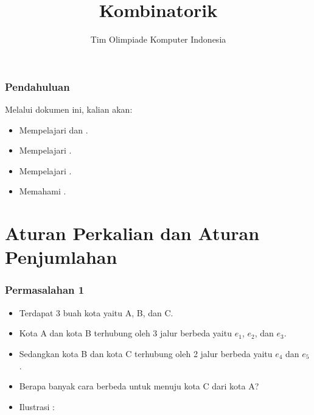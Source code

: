 
\usepackage{tikz}

\title{Kombinatorik}
\author{Tim Olimpiade Komputer Indonesia}
\date{}



\begin{frame}
\titlepage
\end{frame}

\begin{frame}
\frametitle{Pendahuluan}
Melalui dokumen ini, kalian akan:
\begin{itemize}
  \item Mempelajari  dan .
  \item Mempelajari .
  \item Mempelajari .
  \item Memahami .
\end{itemize}
\end{frame}

\section{Aturan Perkalian dan Aturan Penjumlahan}
\frame{\sectionpage}

\begin{frame}
\frametitle{Permasalahan 1}
\begin{itemize}
  \item Terdapat 3 buah kota yaitu A, B, dan C.
  \item Kota A dan kota B terhubung oleh 3 jalur berbeda yaitu $e_{1}$, $e_{2}$, dan $e_{3}$.
  \item Sedangkan kota B dan kota C terhubung oleh 2 jalur berbeda yaitu $e_{4}$ dan $e_{5}$.
  \item Berapa banyak cara berbeda untuk menuju kota C dari kota A?
  \item Ilustrasi : 
  \newline
\end{itemize}
\end{frame}

